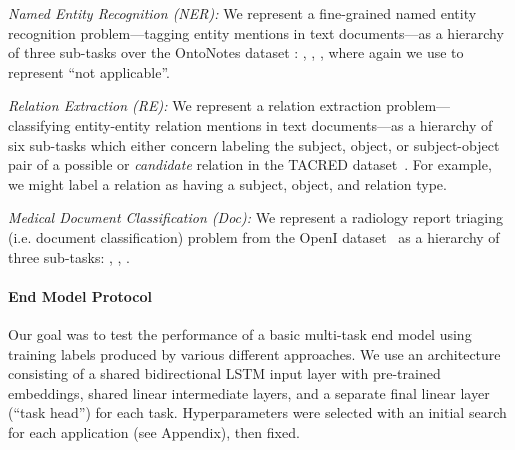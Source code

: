 \documentclass[letterpaper]{article}
\begin{document}
\textit{Named Entity Recognition (NER):}
We represent a fine-grained named entity recognition problem---tagging entity mentions in text documents---as a hierarchy of three sub-tasks over the OntoNotes dataset \cite{weischedel2011ontonotes}:   ,   ,   , where again we use  to represent ``not applicable''.

\textit{Relation Extraction (RE):}
We represent a relation extraction problem---classifying entity-entity relation mentions in text documents---as a hierarchy of six sub-tasks which either concern labeling the subject, object, or subject-object pair of a possible or \textit{candidate} relation in the TACRED dataset~\cite{zhang2017position}.
For example, we might label a relation as having a  subject,  object, and  relation type.

\textit{Medical Document Classification (Doc):}
We represent a radiology report triaging (i.e. document classification) problem from the OpenI dataset~\cite{NationalInstitutesofHealth2017Open-i:Engine} as a hierarchy of three sub-tasks:   ,   ,   .

\paragraph*{End Model Protocol}
Our goal was to test the performance of a basic multi-task end model using training labels produced by various different approaches.
We use an architecture consisting of a shared bidirectional LSTM input layer
with pre-trained embeddings, shared linear intermediate layers, and a separate final linear layer (``task head'') for each task.
Hyperparameters were selected with an initial search for each application (see Appendix), then fixed.
\end{document}
